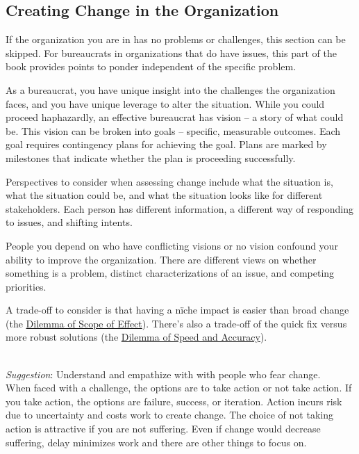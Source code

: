 \subsection*{Creating Change in the Organization\label{sec:creating-change}}

If the organization you are in has no problems or challenges, this section can be skipped. For bureaucrats in organizations that do have issues, this part of the book provides points to ponder independent of the specific problem.

As a bureaucrat, you have unique insight into the challenges the organization faces, and you have unique leverage to alter the situation.  While you could proceed haphazardly, an effective bureaucrat has vision -- a story of what could be. This vision can be broken into goals -- specific, measurable outcomes. Each goal requires contingency plans for achieving the goal. Plans are marked by milestones that indicate whether the plan is proceeding successfully. 

Perspectives to consider when assessing change include what the situation is, what the situation could be, and what the situation looks like for different stakeholders. Each person has different information, a different way of responding to issues, and shifting intents.

People you depend on who have conflicting visions or no vision confound your ability to improve the organization. There are different views on whether something is a problem, distinct characterizations of an issue, and competing priorities.

A trade-off to consider is that having a n\"iche impact is easier than broad change (the \hyperref[table:dilemma-personal-scope-broad-vs-narrow]{Dilemma of Scope of Effect}). 
%
There's also a trade-off of the quick fix versus more robust solutions (the \hyperref[table:dilemma-personal-quick-methodical]{Dilemma of Speed and Accuracy}).




\ \\
\textit{Suggestion}: Understand and empathize with with people who fear change. \\
When faced with a challenge, the options are to take action or not take action. If you take action, the options are failure, success, or iteration. Action incurs risk due to uncertainty and costs work to create change.
The choice of not taking action is attractive if you are not suffering. Even if change would decrease suffering, delay minimizes work and there are other things to focus on.


